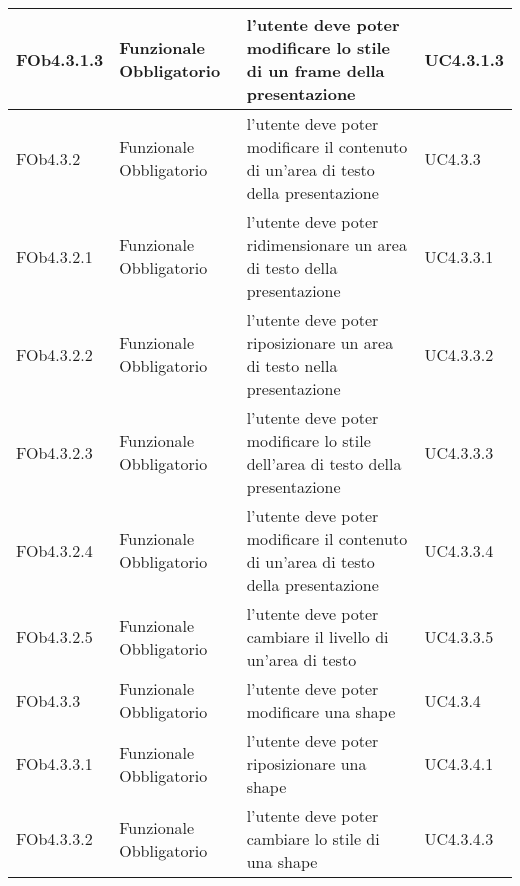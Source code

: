 \begin{longtable}{|l|p{2.5cm}|p{5cm}|p{3.5cm}|}
\hline
FOb4.3.1.3 & Funzionale \linebreak Obbligatorio & l'utente deve poter modificare lo stile di un frame della presentazione & UC4.3.1.3 \linebreak  \\
\hline
FOb4.3.2 & Funzionale \linebreak Obbligatorio & l'utente deve poter modificare il contenuto di un'area di testo della presentazione & UC4.3.3 \linebreak  \\
\hline
FOb4.3.2.1 & Funzionale \linebreak Obbligatorio & l'utente deve poter ridimensionare un area di testo della presentazione & UC4.3.3.1 \linebreak  \\
\hline
FOb4.3.2.2 & Funzionale \linebreak Obbligatorio & l'utente deve poter riposizionare un area di testo nella presentazione & UC4.3.3.2 \linebreak  \\
\hline
FOb4.3.2.3 & Funzionale \linebreak Obbligatorio & l'utente deve poter modificare lo stile dell'area di testo della presentazione & UC4.3.3.3 \linebreak  \\
\hline
FOb4.3.2.4 & Funzionale \linebreak Obbligatorio & l'utente deve poter modificare il contenuto di un'area di testo della presentazione & UC4.3.3.4 \linebreak  \\
\hline
FOb4.3.2.5 & Funzionale \linebreak Obbligatorio & l'utente deve poter cambiare il livello di un'area di testo & UC4.3.3.5 \linebreak  \\
\hline
FOb4.3.3 & Funzionale \linebreak Obbligatorio & l'utente deve poter modificare una shape & UC4.3.4 \linebreak  \\
\hline
FOb4.3.3.1 & Funzionale \linebreak Obbligatorio & l'utente deve poter riposizionare una shape & UC4.3.4.1 \linebreak  \\
\hline
FOb4.3.3.2 & Funzionale \linebreak Obbligatorio & l'utente deve poter cambiare lo stile di una shape & UC4.3.4.3 \linebreak  \\

\end{longtable}
